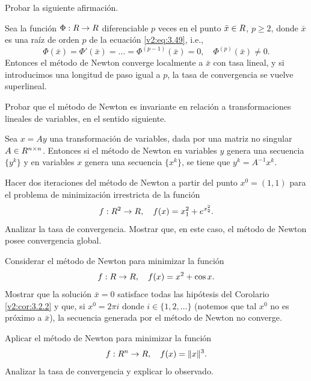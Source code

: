 \begin{exercise}\label{v2:ejer:3.2.5}
    Probar la siguiente afirmación.
    
    Sea la función $\Phi : R \to R$ diferenciable $p$ veces en el punto $\bar{x} \in R$, $p \ge 2$, donde $\bar{x}$ es una raíz de orden $p$ de la ecuación \eqref{v2:eq:3.49}, i.e.,
    \[
        \Phi(\bar{x}) = \Phi'(\bar{x}) = \dots = \Phi^{(p-1)}(\bar{x}) = 0, \quad \Phi^{(p)}(\bar{x}) \neq 0.
    \]
    Entonces el método de Newton converge localmente a $\bar{x}$ con tasa lineal, y si introducimos una longitud de paso igual a $p$, la tasa de convergencia se vuelve superlineal.
\end{exercise}

\begin{exercise}\label{v2:ejer:3.2.6}
    Probar que el método de Newton es invariante en relación a transformaciones lineales de variables, en el sentido siguiente.
    
    Sea $x = Ay$ una transformación de variables, dada por una matriz no singular $A \in R^{n \times n}$. Entonces si el método de Newton en variables $y$ genera una secuencia $\{y^k\}$ y en variables $x$ genera una secuencia $\{x^k\}$, se tiene que $y^k = A^{-1}x^k$.
\end{exercise}

\begin{exercise}\label{v2:ejer:3.2.7}
    Hacer dos iteraciones del método de Newton a partir del punto $x^0 = (1, 1)$ para el problema de minimización irrestricta de la función
    \[
        f : R^2 \to R, \quad f(x) = x_1^2 + e^{x_2^2}.
    \]
    Analizar la tasa de convergencia. Mostrar que, en este caso, el método de Newton posee convergencia global.
\end{exercise}

\begin{exercise}\label{v2:ejer:3.2.8}
    Considerar el método de Newton para minimizar la función
    \[
        f : R \to R, \quad f(x) = x^2 + \cos x.
    \]
    Mostrar que la solución $\bar{x} = 0$ satisface todas las hipótesis del Corolario \ref{v2:cor:3.2.2} y que, si $x^0 = 2\pi i$ donde $i \in \{1, 2, \dots\}$ (notemos que tal $x^0$ no es próximo a $\bar{x}$), la secuencia generada por el método de Newton no converge.
\end{exercise}

\begin{exercise}\label{v2:ejer:3.2.9}
    Aplicar el método de Newton para minimizar la función
    \[
        f : R^n \to R, \quad f(x) = \|x\|^3.
    \]
    Analizar la tasa de convergencia y explicar lo observado.
\end{exercise}

